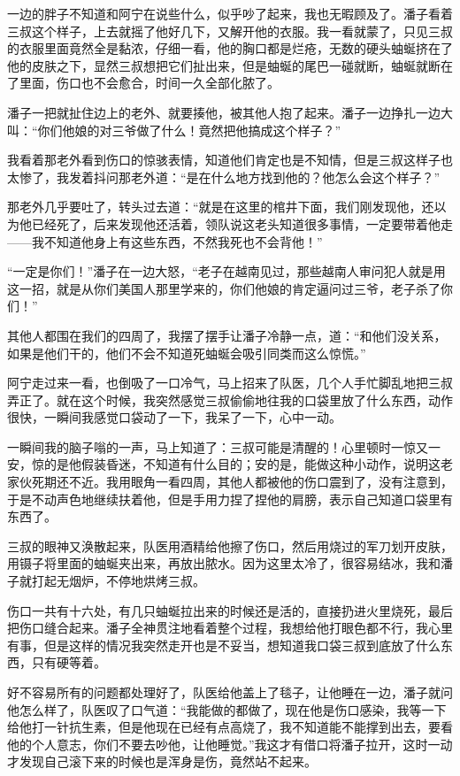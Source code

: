 一边的胖子不知道和阿宁在说些什么，似乎吵了起来，我也无暇顾及了。潘子看着三叔这个样子，上去就摇了他好几下，又解开他的衣服。我一看就蒙了，只见三叔的衣服里面竟然全是黏浓，仔细一看，他的胸口都是烂疮，无数的硬头蚰蜒挤在了他的皮肤之下，显然三叔想把它们扯出来，但是蚰蜒的尾巴一碰就断，蚰蜒就断在了里面，伤口也不会愈合，时间一久全部化脓了。

潘子一把就扯住边上的老外、就要揍他，被其他人抱了起来。潘子一边挣扎一边大叫：“你们他娘的对三爷做了什么！竟然把他搞成这个样子？”

我看着那老外看到伤口的惊骇表情，知道他们肯定也是不知情，但是三叔这样子也太惨了，我发着抖问那老外道：“是在什么地方找到他的？他怎么会这个样子？”

那老外几乎要吐了，转头过去道：“就是在这里的棺井下面，我们刚发现他，还以为他已经死了，后来发现他还活着，领队说这老头知道很多事情，一定要带着他走——我不知道他身上有这些东西，不然我死也不会背他！”

“一定是你们！”潘子在一边大怒，“老子在越南见过，那些越南人审问犯人就是用这一招，就是从你们美国人那里学来的，你们他娘的肯定逼问过三爷，老子杀了你们！”

其他人都围在我们的四周了，我摆了摆手让潘子冷静一点，道：“和他们没关系，如果是他们干的，他们不会不知道死蚰蜒会吸引同类而这么惊慌。”

阿宁走过来一看，也倒吸了一口冷气，马上招来了队医，几个人手忙脚乱地把三叔弄正了。就在这个时候，我突然感觉三叔偷偷地往我的口袋里放了什么东西，动作很快，一瞬间我感觉口袋动了一下，我呆了一下，心中一动。

一瞬间我的脑子嗡的一声，马上知道了：三叔可能是清醒的！心里顿时一惊又一安，惊的是他假装昏迷，不知道有什么目的；安的是，能做这种小动作，说明这老家伙死期还不近。我用眼角一看四周，其他人都被他的伤口震到了，没有注意到，于是不动声色地继续扶着他，但是手用力捏了捏他的肩膀，表示自己知道口袋里有东西了。

三叔的眼神又涣散起来，队医用酒精给他擦了伤口，然后用烧过的军刀划开皮肤，用镊子将里面的蚰蜒夹出来，再放出脓水。因为这里太冷了，很容易结冰，我和潘子就打起无烟炉，不停地烘烤三叔。

伤口一共有十六处，有几只蚰蜒拉出来的时候还是活的，直接扔进火里烧死，最后把伤口缝合起来。潘子全神贯注地看着整个过程，我想给他打眼色都不行，我心里有事，但是这样的情况我突然走开也是不妥当，想知道我口袋三叔到底放了什么东西，只有硬等着。

好不容易所有的问题都处理好了，队医给他盖上了毯子，让他睡在一边，潘子就问他怎么样了，队医叹了口气道：“我能做的都做了，现在他是伤口感染，我等一下给他打一针抗生素，但是他现在已经有点高烧了，我不知道能不能撑到出去，要看他的个人意志，你们不要去吵他，让他睡觉。”我这才有借口将潘子拉开，这时一动才发现自己滚下来的时候也是浑身是伤，竟然站不起来。

